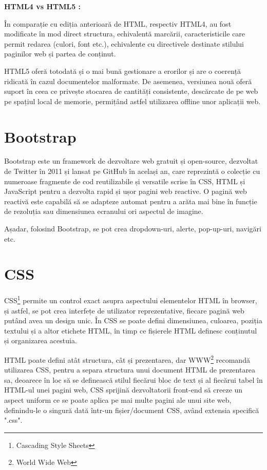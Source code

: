 \textbf{ HTML4 vs HTML5 :}\newline

În comparație cu ediția anterioară de HTML, respectiv HTML4, au fost modificate în mod direct structura, echivalentă marcării, caracteristicile care permit redarea (culori, font etc.), echivalente cu directivele destinate stilului paginilor web și partea de conținut.\newline

HTML5 oferă totodată și o mai bună gestionare a erorilor și are o coerență ridicată în cazul documentelor malformate. De asemenea, versiunea nouă  oferă suport în ceea ce privește stocarea de cantități consistente, descărcate de pe web pe spațiul local de memorie, permițând astfel utilizarea offline unor aplicații web.
\newline

\section{Bootstrap}

Bootstrap este un framework de dezvoltare web gratuit și open-source, dezvoltat de Twitter în 2011 și lansat pe GitHub în același an, care reprezintă o colecție cu numeroase fragmente de cod reutilizabile și versatile scrise în CSS, HTML și JavaScript pentru a dezvolta rapid și ușor pagini web reactive.\newline
O pagină web reactivă este capabilă să se adapteze automat pentru a arăta mai bine în funcție de rezoluția sau dimensiunea ecranului ori aspectul de imagine.\newline

Așadar, folosind Bootstrap, se pot crea dropdown-uri, alerte, pop-up-uri, navigări etc.

\section{CSS}

CSS\footnote{Cascading Style Sheets} permite un control exact asupra aspectului elementelor HTML în browser, și astfel, se pot crea interfețe de utilizator reprezentative, fiecare pagină web putând avea un design unic. În CSS se poate defini dimensiunea, culoarea, poziția textului și a altor etichete HTML, în timp ce fișierele HTML definesc conținutul și organizarea acestuia.\newline

HTML poate defini atât structura, cât și prezentarea, dar WWW\footnote{World Wide Web} recomandă utilizarea CSS, pentru a separa structura unui document HTML de prezentarea sa, deoarece în loc să se definească stilul fiecărui bloc de text și al fiecărui tabel în HTML-ul unei pagini web, CSS sprijină dezvoltatorii front-end să creeze un aspect uniform ce se poate aplica pe mai multe pagini ale unui site web, definindu-le o singură dată într-un fișier/document CSS, având extensia specifică ".css".\newline

